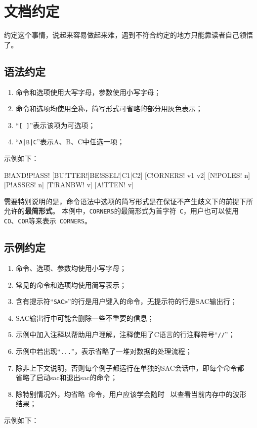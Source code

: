 \section{文档约定}
约定这个事情，说起来容易做起来难，遇到不符合约定的地方只能靠读者自己领悟了。

\subsection*{语法约定}
\begin{enumerate}
\item 命令和选项使用大写字母，参数使用小写字母；
\item 命令和选项均使用全称，简写形式可省略的部分用灰色表示；
\item ``\verb+[ ]+''表示该项为可选项；
\item ``\verb+A|B|C+''表示A、B、C中任选一项；
\end{enumerate}

示例如下：
\begin{SACSTX}
B!AND!P!ASS! [BU!TTER!|BE!SSEL!|C1|C2] [C!ORNERS! v1 v2] [N!POLES! n] [P!ASSES! n]
    [T!RANBW! v] [A!TTEN! v]
\end{SACSTX}

需要特别说明的是，命令语法中选项的简写形式是在保证不产生歧义下的前提下所允许的\textbf{最简形式}。
本例中，\verb+CORNERS+的最简形式为首字符~\verb+C+，用户也可以使用
\verb+CO+、\verb+COR+等来表示~\verb+CORNERS+。

\subsection*{示例约定}
\begin{enumerate}
\item 命令、选项、参数均使用小写字母；
\item 常见的命令和选项均使用简写表示；
\item 含有提示符``\verb+SAC>+''的行是用户键入的命令，无提示符的行是SAC输出行；
\item SAC输出行中可能会删除一些不重要的信息；
\item 示例中加入注释以帮助用户理解，注释使用了C语言的行注释符号``\verb+//+''；
\item 示例中若出现``\verb+...+''，表示省略了一堆对数据的处理流程；
\item 除非上下文说明，否则每个例子都运行在单独的SAC会话中，即每个命令都
    省略了启动sac和退出sac的命令；
\item 除特别情况外，均省略~命令，用户应该学会随时~
    以查看当前内存中的波形结果；
\end{enumerate}

示例如下：
